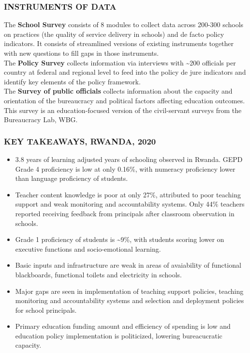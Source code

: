 \documentclass[twocolumn]{article}
\providecommand{\tightlist}{%
  \setlength{\itemsep}{0pt}\setlength{\parskip}{0pt}}
\begin{document}
\hypertarget{instruments-of-data}{%
\subsubsection{\texorpdfstring{\textbf{INSTRUMENTS OF
DATA}}{INSTRUMENTS OF DATA}}\label{instruments-of-data}}

The \textbf{School Survey} consists of 8 modules to collect data across
200-300 schools on practices (the quality of service delivery in
schools) and de facto policy indicators. It consists of streamlined
versions of existing instruments together with new questions to fill
gaps in those instruments.\\
The \textbf{Policy Survey} collects information via interviews with
\textasciitilde{}200 officials per country at federal and regional level
to feed into the policy de jure indicators and identify key elements of
the policy framework.\\
The \textbf{Survey of public officials} collects information about the
capacity and orientation of the bureaucracy and political factors
affecting education outcomes. This survey is an education-focused
version of the civil-servant surveys from the Bureaucracy Lab, WBG.

\hypertarget{key-takeaways-2020}{%
\subsubsection{\texorpdfstring{\textbf{KEY TAKEAWAYS,
\uppercase{Rwanda},
2020}}{KEY TAKEAWAYS, , 2020}}\label{key-takeaways-2020}}

\begin{itemize}
\tightlist
\item
  3.8 years of learning adjusted years of schooling observed in Rwanda.
  GEPD Grade 4 proficiency is low at only 0.16\%, with numeracy
  proficiency lower than language proficiency of students.
\item
  Teacher content knowledge is poor at only 27\%, attributed to poor
  teaching support and weak monitoring and accountability systems. Only
  44\% teachers reported receiving feedback from principals after
  classroom observation in schools.
\item
  Grade 1 proficiency of students is \textasciitilde{}9\%, with students
  scoring lower on executive functions and socio-emotional learning.
\item
  Basic inputs and infrastructure are weak in areas of avaiability of
  functional blackboards, functional toilets and electricity in schools.
\item
  Major gaps are seen in implementation of teaching support policies,
  teaching monitoring and accountability systems and selection and
  deployment policies for school principals.
\item
  Primary education funding amount and efficiency of spending is low and
  education policy implementation is politicized, lowering bureacucratic
  capacity.
\end{itemize}
\end{document}
